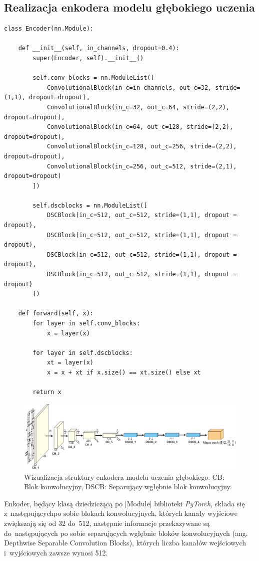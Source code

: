 \subsection{Realizacja enkodera modelu głębokiego uczenia} \label{Encoder}
\begin{lstlisting}[caption={\pyth|Encoder| - klasa enkodera modelu głębokiego uczenia.}, label={encoder}]
class Encoder(nn.Module):
	
	def __init__(self, in_channels, dropout=0.4):
		super(Encoder, self).__init__()
	
		self.conv_blocks = nn.ModuleList([
			ConvolutionalBlock(in_c=in_channels, out_c=32, stride=(1,1), dropout=dropout),
			ConvolutionalBlock(in_c=32, out_c=64, stride=(2,2), dropout=dropout),
			ConvolutionalBlock(in_c=64, out_c=128, stride=(2,2), dropout=dropout),
			ConvolutionalBlock(in_c=128, out_c=256, stride=(2,2), dropout=dropout),
			ConvolutionalBlock(in_c=256, out_c=512, stride=(2,1), dropout=dropout)
		])
		
		self.dscblocks = nn.ModuleList([
			DSCBlock(in_c=512, out_c=512, stride=(1,1), dropout = dropout),
			DSCBlock(in_c=512, out_c=512, stride=(1,1), dropout = dropout),
			DSCBlock(in_c=512, out_c=512, stride=(1,1), dropout = dropout),
			DSCBlock(in_c=512, out_c=512, stride=(1,1), dropout = dropout)
		])
	
	def forward(self, x):
		for layer in self.conv_blocks:
			x = layer(x)
	
		for layer in self.dscblocks:
			xt = layer(x)
			x = x + xt if x.size() == xt.size() else xt
	
		return x
\end{lstlisting}

\begin{figure}[h]
	\centering
	\includegraphics[width=15cm]{images/Encoder_illst.pdf}
	\caption{Wizualizacja struktury enkodera modelu uczenia głębokiego. CB: Blok konwolucyjny, DSCB: Separujący wgłębnie blok konwolucyjny.}
	\label{fig:encoder-model-vis}
\end{figure}

Enkoder, będący klasą dziedziczącą po \pyth|Module| biblioteki \textit{PyTorch}, składa się z~następujących\linebreak po sobie blokach konwolucyjnych, których kanały wyjściowe zwiększają się od 32 do~512, następnie informacje przekazywane są do~następujących po sobie separujących wgłębnie bloków konwolucyjnych (ang. Depthwise Separable Convolution Blocks), których liczba kanałów wejściowych i~wyjściowych zawsze wynosi 512.

